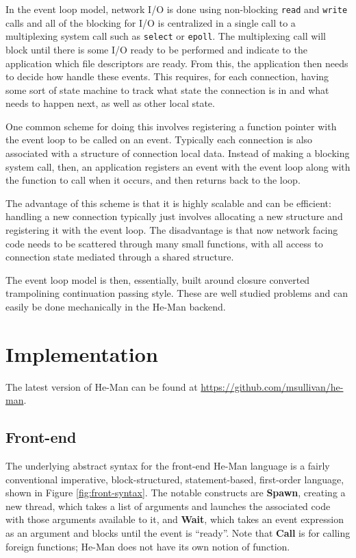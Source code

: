 \documentclass[preprint]{sigplanconf}
\renewcommand{\t}{\texttt}
\renewcommand{\b}{\textbf}
\begin{document}
In the event loop model, network I/O is done using non-blocking
\t{read} and \t{write} calls and all of the blocking for I/O is
centralized in a single call to a multiplexing system call such as
\t{select} or \t{epoll}. The multiplexing call will block until there
is some I/O ready to be performed and indicate to the application
which file descriptors are ready. From this, the application then
needs to decide how handle these events. This requires, for each
connection, having some sort of state machine to track what state the
connection is in and what needs to happen next, as well as other local
state.

One common scheme for doing this involves registering a function
pointer with the event loop to be called on an event. Typically each
connection is also associated with a structure of connection local
data. Instead of making a blocking system call, then, an application
registers an event with the event loop along with the function to call
when it occurs, and then returns back to the loop.

The advantage of this scheme is that it is highly scalable and can be
efficient: handling a new connection typically just involves
allocating a new structure and registering it with the event loop. The
disadvantage is that now network facing code needs to be scattered
through many small functions, with all access to connection state
mediated through a shared structure.

The event loop model is then, essentially, built around closure
converted trampolining continuation passing style. These are well
studied problems and can easily be done mechanically in the He-Man
backend.

\section{Implementation}

The latest version of He-Man can be found at
\url{https://github.com/msullivan/he-man}.

\subsection{Front-end}

The underlying abstract syntax for the front-end He-Man language is a
fairly conventional imperative, block-structured, statement-based,
first-order language, shown in Figure \ref{fig:front-syntax}. The
notable constructs are \b{Spawn}, creating a new thread, which takes a
list of arguments and launches the associated code with those
arguments available to it, and \b{Wait}, which takes an event
expression as an argument and blocks until the event is
``ready''. Note that \b{Call} is for calling foreign functions; He-Man
does not have its own notion of function.
\end{document}
